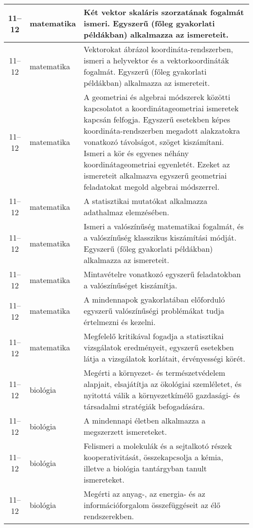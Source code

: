 \begin{small}
\begin{longtable}{c | p{2cm} |  p{11cm} }
              11--12 & matematika & Két vektor skaláris szorzatának fogalmát ismeri.  Egyszerű (főleg gyakorlati példákban) alkalmazza az ismereteit. \\ \hline
              11--12 & matematika & Vektorokat ábrázol koordináta-rendszerben, ismeri a helyvektor és a vektorkoordináták fogalmát. Egyszerű (főleg gyakorlati példákban) alkalmazza az ismereteit. \\ \hline
              11--12 & matematika & A geometriai és algebrai módszerek közötti kapcsolatot a koordinátageometriai ismeretek kapcsán felfogja. Egyszerű esetekben képes koordináta-rendszerben megadott alakzatokra vonatkozó távolságot, szöget kiszámítani. Ismeri a kör és egyenes néhány koordinátageometriai egyenletét. Ezeket az ismereteit alkalmazva egyszerű geometriai feladatokat megold algebrai módszerrel. \\ \hline
              11--12 & matematika & A statisztikai mutatókat alkalmazza adathalmaz elemzésében. \\ \hline
              11--12 & matematika & Ismeri a valószínűség matematikai fogalmát, és a valószínűség klasszikus kiszámítási módját. Egyszerű (főleg gyakorlati példákban) alkalmazza az ismereteit. \\ \hline
              11--12 & matematika & Mintavételre vonatkozó egyszerű feladatokban a valószínűséget kiszámítja. \\ \hline
              11--12 & matematika & A mindennapok gyakorlatában előforduló egyszerű valószínűségi problémákat tudja értelmezni és kezelni. \\ \hline
              11--12 & matematika & Megfelelő kritikával fogadja a statisztikai vizsgálatok eredményeit, egyszerű esetekben látja a vizsgálatok korlátait, érvényességi körét. \\ \hline
              11--12 & biológia & Megérti a környezet- és természetvédelem alapjait, elsajátítja az ökológiai szemléletet, és nyitottá válik a környezetkímélő gazdasági- és társadalmi stratégiák befogadására. \\ \hline
              11--12 & biológia & A mindennapi életben alkalmazza a megszerzett ismereteket. \\ \hline
              11--12 & biológia & Felismeri a molekulák és a sejtalkotó részek kooperativitását, összekapcsolja  a kémia, illetve a biológia tantárgyban tanult ismereteket. \\ \hline
              11--12 & biológia & Megérti az anyag-, az energia- és az információforgalom összefüggéseit az élő rendszerekben. \\ \hline

\end{longtable}
\end{small}
